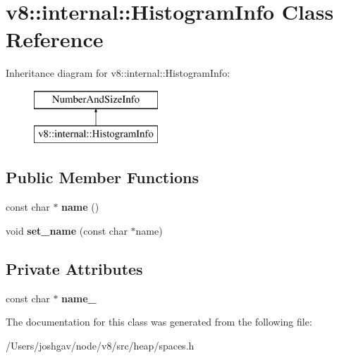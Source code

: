 \hypertarget{classv8_1_1internal_1_1_histogram_info}{}\section{v8\+:\+:internal\+:\+:Histogram\+Info Class Reference}
\label{classv8_1_1internal_1_1_histogram_info}
Inheritance diagram for v8\+:\+:internal\+:\+:Histogram\+Info\+:\begin{figure}[H]
\begin{center}
\leavevmode
\includegraphics[height=2.000000cm]{classv8_1_1internal_1_1_histogram_info}
\end{center}
\end{figure}
\subsection*{Public Member Functions}
\begin{DoxyCompactItemize}
\item 
const char $\ast$ {\bfseries name} ()\hypertarget{classv8_1_1internal_1_1_histogram_info_a7a5eb0872cf6a15ba64c355ee47dda9c}{}\label{classv8_1_1internal_1_1_histogram_info_a7a5eb0872cf6a15ba64c355ee47dda9c}

\item 
void {\bfseries set\+\_\+name} (const char $\ast$name)\hypertarget{classv8_1_1internal_1_1_histogram_info_ae4ea0ecca4937a690df5e34516f0b792}{}\label{classv8_1_1internal_1_1_histogram_info_ae4ea0ecca4937a690df5e34516f0b792}

\end{DoxyCompactItemize}
\subsection*{Private Attributes}
\begin{DoxyCompactItemize}
\item 
const char $\ast$ {\bfseries name\+\_\+}\hypertarget{classv8_1_1internal_1_1_histogram_info_ab273a6883dfd889cfa8932551dcd46e9}{}\label{classv8_1_1internal_1_1_histogram_info_ab273a6883dfd889cfa8932551dcd46e9}

\end{DoxyCompactItemize}


The documentation for this class was generated from the following file\+:\begin{DoxyCompactItemize}
\item 
/\+Users/joshgav/node/v8/src/heap/spaces.\+h\end{DoxyCompactItemize}
